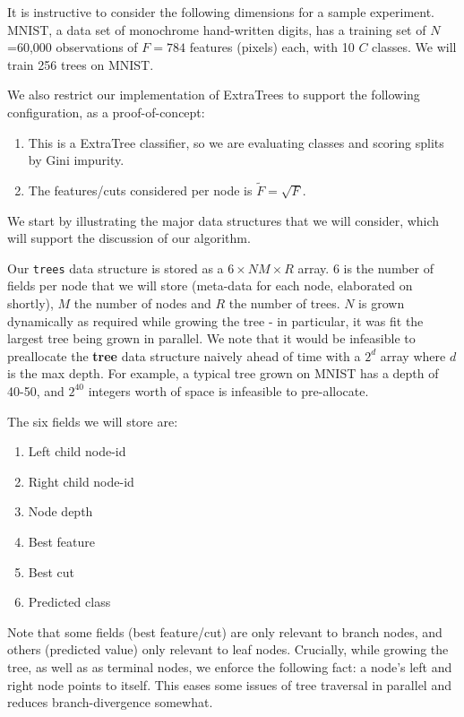 \documentclass[10pt,conference]{IEEEtran}
\begin{document}
  It is instructive to consider the following dimensions for a sample experiment. MNIST, a data set of monochrome hand-written digits, has a training set of $N$=60,000 observations of $F=784$ features (pixels) each, with 10 $C$ classes. We will train 256 trees on MNIST.
  
  We also restrict our implementation of ExtraTrees to support the following configuration, as a proof-of-concept:
  
  \begin{enumerate}
    \item This is a ExtraTree classifier, so we are evaluating classes and scoring splits by Gini impurity.
    \item The features/cuts considered per node is $\tilde{F}=\sqrt{F}$.
  \end{enumerate}

  We start by illustrating the major data structures that we will consider, which will support the discussion of our algorithm. 
  
  Our \texttt{trees} data structure is stored as a $6 \times NM\times R$ array. $6$ is the number of fields per node that we will store (meta-data for each node, elaborated on shortly), $M$ the number of nodes and $R$ the number of trees. $N$ is grown dynamically as required while growing the tree - in particular, it was fit the largest tree being grown in parallel. We note that it would be infeasible to preallocate the \textbf{tree} data structure naively ahead of time with a $2^d$ array where $d$ is the max depth. For example, a typical tree grown on MNIST has a depth of 40-50, and $2^40$ integers worth of space is infeasible to pre-allocate. 
  
  The six fields we will store are:
  
  \begin{enumerate}
    \item Left child node-id
    \item Right child node-id
    \item Node depth
    \item Best feature
    \item Best cut
    \item Predicted class
  \end{enumerate}
  
  Note that some fields (best feature/cut) are only relevant to branch nodes, and others (predicted value) only relevant to leaf nodes. Crucially, while growing the tree, as well as as terminal nodes, we enforce the following fact: a node's left and right node points to itself. This eases some issues of tree traversal in parallel and reduces branch-divergence somewhat.
  
\end{document}
